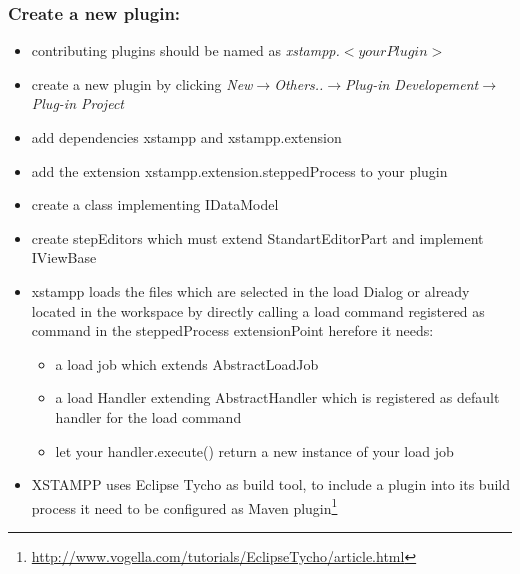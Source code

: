 \subsubsection{Create a new plugin:}
\begin{itemize}
\item contributing plugins should be named as \textit{xstampp.}$<your Plugin>$
\item create a new plugin by clicking \textit{New}$\rightarrow$\textit{Others..}$\rightarrow$\textit{Plug-in Developement}$\rightarrow$\textit{Plug-in Project}
\item add dependencies xstampp and xstampp.extension
\item add the extension xstampp.extension.steppedProcess to your plugin
\item create a class implementing IDataModel
\item create stepEditors which must extend StandartEditorPart and implement IViewBase
\item xstampp loads the files which are selected in the load Dialog or already located in the workspace 
	  by directly calling a load command registered as command in the steppedProcess extensionPoint herefore it needs:
	\begin{itemize}
	\item a load job which extends AbstractLoadJob
	\item a load Handler extending AbstractHandler which is registered as default handler for the load command 
	\item let your handler.execute() return a new instance of your load job
	\end{itemize}
\item XSTAMPP uses Eclipse Tycho as build tool, to include a  plugin into its build process it need to be configured as Maven plugin\footnote{\url{http://www.vogella.com/tutorials/EclipseTycho/article.html}}
\end{itemize}